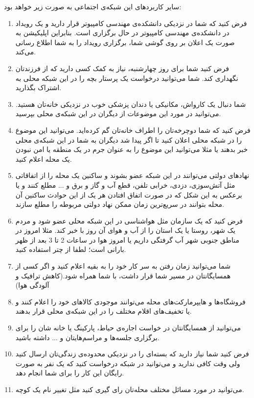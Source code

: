 سایر کاربرد‌های این شبکه‌ی اجتماعی به صورت زیر خواهد بود:

\begin{enumerate}
	\item 
	فرض کنید که شما در نزدیکی دانشکده‌ی مهندسی کامپیوتر قرار دارید و یک رویداد در دانشکده‌ی مهندسی کامپیوتر در حال برگزاری است. بنابراین اپلیکیشن به صورت یک اعلان بر روی گوشی شما، برگزاری رویداد را به شما اطلاع رسانی می‌کند.
	\item 
	فرض کنید شما برای روز چهارشنبه، نیاز به کمک کسی دارید که از فرزندتان نگهداری کند. شما می‌توانید درخواست یک پرستار بچه را در این شبکه محلی به اشتراک بگذارید.
	
	\item 
	شما دنبال یک کارواش، مکانیکی یا دندان پزشکی خوب در نزدیکی خانه‌تان هستید. می‌توانید در مورد این موضوعات از دیگران در این شبکه‌ی محلی بپرسید.
	\item 
	فرض کنید که شما دوچرخه‌تان را اطراف خانه‌تان گم کرده‌اید. می‌توانید این موضوع را در شبکه محلی اعلان کنید تا اگر پیدا شد دیگران به شما در این شبکه‌ی محلی خبر بدهند یا مثلا می‌توانید این موضوع را به عنوان جرم در یک منطقه یا امن نبودن یک محله اعلام کنید.
	
	\item 
	نهاد‌های دولتی می‌توانند در این شبکه عضو بشوند و ساکنین یک محله را از اتفاقاتی مثل آتش‌سوزی، دزدی، خرابی تلفن، قطع آب و گاز و برق و ... مطلع کنند و یا برعکس به این شکل که در صورت اتفاق افتادن هر یک از این حوادث ساکنین آن محله بتوانند در سریع‌ترین زمان ممکن نهاد دولتی مربوطه را مطلع سازند.
	
	\item 
	فرض کنید که یک سازمان مثل هواشناسی در این شبکه محلی عضو شود و مردم یک شهر، روستا یا یک استان را از آب و هوای آن روز با خبر کند. مثلا امروز در مناطق جنوبی شهر آب گرفتگی داریم یا امروز هوا در ساعات  2 تا 3 بعد از ظهر بارانی است؛ لطفا از چتر استفاده کنید.
	
	\item
	شما می‌توانید زمان رفتن به سر کار خود را به بقیه اعلام کنید و اگر کسی از همسایگانتان در مسیر شما قرار داشت، با شما همراه شود.(کاهش ترافیک و آلودگی هوا)
	\item 
	فروشگاه‌ها و هایپرمارکت‌های محله می‌توانند موجودی کالا‌های خود را اعلام کنند و یا تخفیف‌های اقلام مختلف را در این شبکه‌ی محلی قرار بدهند.
	\item 
	می‌توانید از همسایگانتان در خواست اجاره‌ی حیاط، پارکینگ یا خانه شان را برای برگزاری جلسه‌ها و مراسم‌هایتان و ... داشته باشید.
	\item 
	فرض کنید شما نیاز دارید که بسته‌ای را در نزدیکی محدوده‌ی زندگی‌تان ارسال کنید ولی وقت کافی ندارید و می‌توانید در شبکه درخواست کنید که یک نفر به صورت رایگان این کار را برای شما انجام دهد.
	\item 
	می‌توانید در مورد مسائل مختلف محله‌تان رای گیری کنید مثل تغییر نام یک کوچه.
	 
\end{enumerate}
 
